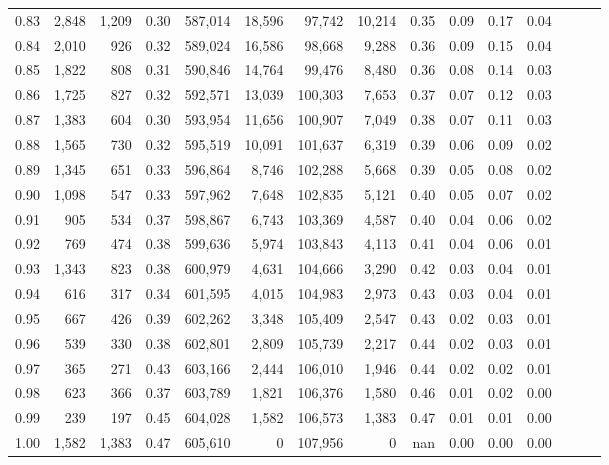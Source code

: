 \begin{tabular}{rrrrrrrrrrrrrrr}
0.83 &   2,848 &  1,209 &  0.30 &  587,014 &   18,596 &   97,742 &   10,214 &  0.35 &  0.09 &  0.17 &      0.04 \\
0.84 &   2,010 &    926 &  0.32 &  589,024 &   16,586 &   98,668 &    9,288 &  0.36 &  0.09 &  0.15 &      0.04 \\
0.85 &   1,822 &    808 &  0.31 &  590,846 &   14,764 &   99,476 &    8,480 &  0.36 &  0.08 &  0.14 &      0.03 \\
0.86 &   1,725 &    827 &  0.32 &  592,571 &   13,039 &  100,303 &    7,653 &  0.37 &  0.07 &  0.12 &      0.03 \\
0.87 &   1,383 &    604 &  0.30 &  593,954 &   11,656 &  100,907 &    7,049 &  0.38 &  0.07 &  0.11 &      0.03 \\
0.88 &   1,565 &    730 &  0.32 &  595,519 &   10,091 &  101,637 &    6,319 &  0.39 &  0.06 &  0.09 &      0.02 \\
0.89 &   1,345 &    651 &  0.33 &  596,864 &    8,746 &  102,288 &    5,668 &  0.39 &  0.05 &  0.08 &      0.02 \\
0.90 &   1,098 &    547 &  0.33 &  597,962 &    7,648 &  102,835 &    5,121 &  0.40 &  0.05 &  0.07 &      0.02 \\
0.91 &     905 &    534 &  0.37 &  598,867 &    6,743 &  103,369 &    4,587 &  0.40 &  0.04 &  0.06 &      0.02 \\
0.92 &     769 &    474 &  0.38 &  599,636 &    5,974 &  103,843 &    4,113 &  0.41 &  0.04 &  0.06 &      0.01 \\
0.93 &   1,343 &    823 &  0.38 &  600,979 &    4,631 &  104,666 &    3,290 &  0.42 &  0.03 &  0.04 &      0.01 \\
0.94 &     616 &    317 &  0.34 &  601,595 &    4,015 &  104,983 &    2,973 &  0.43 &  0.03 &  0.04 &      0.01 \\
0.95 &     667 &    426 &  0.39 &  602,262 &    3,348 &  105,409 &    2,547 &  0.43 &  0.02 &  0.03 &      0.01 \\
0.96 &     539 &    330 &  0.38 &  602,801 &    2,809 &  105,739 &    2,217 &  0.44 &  0.02 &  0.03 &      0.01 \\
0.97 &     365 &    271 &  0.43 &  603,166 &    2,444 &  106,010 &    1,946 &  0.44 &  0.02 &  0.02 &      0.01 \\
0.98 &     623 &    366 &  0.37 &  603,789 &    1,821 &  106,376 &    1,580 &  0.46 &  0.01 &  0.02 &      0.00 \\
0.99 &     239 &    197 &  0.45 &  604,028 &    1,582 &  106,573 &    1,383 &  0.47 &  0.01 &  0.01 &      0.00 \\
1.00 &   1,582 &  1,383 &  0.47 &  605,610 &        0 &  107,956 &        0 &   nan &  0.00 &  0.00 &      0.00 \\
\bottomrule
\end{tabular}
